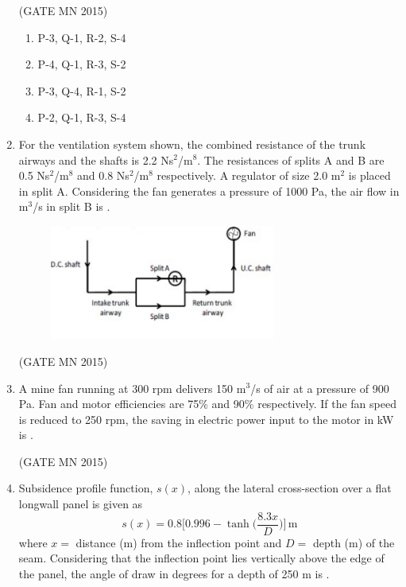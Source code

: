 \documentclass[journal]{IEEEtran}
\begin{document}
\begin{enumerate}
\hfill(GATE MN 2015)

\begin{multicols}{2}
\begin{enumerate}
\item P-3, Q-1, R-2, S-4  
\item P-4, Q-1, R-3, S-2  
\item P-3, Q-4, R-1, S-2  
\item P-2, Q-1, R-3, S-4  
\end{enumerate}
\end{multicols}

\item For the ventilation system shown, the combined resistance of the trunk airways and the shafts is 2.2 Ns$^2$/m$^8$. The resistances of splits A and B are 0.5 Ns$^2$/m$^8$ and 0.8 Ns$^2$/m$^8$ respectively. A regulator of size 2.0 m$^2$ is placed in split A. Considering the fan generates a pressure of 1000 Pa, the air flow in m$^3$/s in split B is \underline{\hspace{2cm}}.  
\begin{figure}[H]                             
\centering                          
\includegraphics[width=0.7\textwidth]{Screenshot_2025_0817_212807.png}    
	\caption{}          
	\label{fig:Q44}        
\end{figure}

\hfill(GATE MN 2015)

\item A mine fan running at 300 rpm delivers 150 m$^{3}$/s of air at a pressure of 900 Pa. Fan and motor efficiencies are 75\% and 90\% respectively. If the fan speed is reduced to 250 rpm, the saving in electric power input to the motor in kW is \underline{\hspace{2cm}}.  

	\hfill(GATE MN 2015)

\item Subsidence profile function, $s(x)$, along the lateral cross-section over a flat longwall panel is given as  
\[
s(x) = 0.8 \Big[0.996 - \tanh\Big(\frac{8.3x}{D}\Big)\Big] \, \text{m}
\]  
where $x =$ distance (m) from the inflection point and $D =$ depth (m) of the seam. Considering that the inflection point lies vertically above the edge of the panel, the angle of draw in degrees for a depth of 250 m is \underline{\hspace{2cm}}. 


\end{enumerate}
\end{document}
